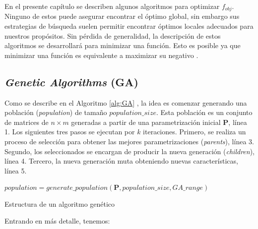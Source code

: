 En el presente capítulo se describen algunos algoritmos para optimizar $f_{obj}$.
Ninguno de estos puede asegurar encontrar el óptimo global, sin embargo sus estrategias 
de búsqueda suelen permitir encontrar óptimos locales adecuados para nuestros propósitos.
Sin pérdida de generalidad, la descripción de estos algoritmos se desarrollará para minimizar una función.
Esto es posible ya que minimizar una función es equivalente a maximizar su negativo \citep{Mykel2019}.


\subsection{\emph{Genetic Algorithms} (GA)}

Como se describe en el Algoritmo \ref{alg:GA} \citep{Mykel2019}, la idea es 
comenzar generando una población (\emph{population}) de tamaño $population\_size$.
Esta población es un conjunto de matrices de $n \times m$ generadas a partir de una parametrización
inicial $\boldsymbol{P}$, línea 1.
Los siguientes tres pasos se ejecutan por $k$ iteraciones.
Primero, se realiza un proceso de selección para obtener las mejores parametrizaciones
(\emph{parents}), línea 3.
Segundo, los seleccionados se encargan de producir la nueva generación
(\emph{children}), línea 4.
Tercero, la nueva generación muta obteniendo nuevas características, línea 5.

\begin{algorithm}
$population = generate\_population(\boldsymbol{P}, population\_size, GA\_range)$ \\
\caption{Estructura de un algoritmo genético}
\label{alg:GA}
\end{algorithm}

Entrando en más detalle, tenemos:

